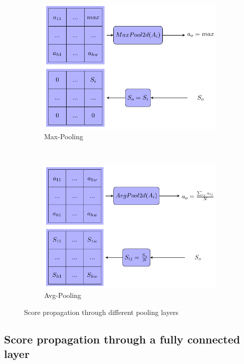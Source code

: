 \begin{figure}[!ht]
	\centering
	\begin{subfigure}{0.4\textwidth}
		\includegraphics[scale=0.5]{Figures/chapter_interpretation/figures/score_maxpool.pdf}
		\caption{Max-Pooling}
	\end{subfigure}
	~ %
	\begin{subfigure}{0.4\textwidth}
		\includegraphics[scale=0.5]{Figures/chapter_interpretation/figures/score_avgpool.pdf}
		\caption{Avg-Pooling}
	\end{subfigure}
	\caption{Score propagation through different pooling layers}
	\label{score:fig:score_pooling}
\end{figure}

\subsection{Score propagation through a fully connected layer} 

